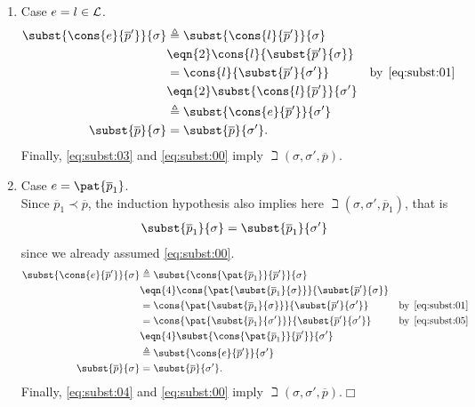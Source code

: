 \begin{enumerate}
\begin{enumerate}
      \item Case \(e = l \in {\cal L}\).
        \begin{align}
          \subst{\cons{e}{\overline{p}'}}{\sigma}
          &\triangleq \subst{\cons{l}{\overline{p}'}}{\sigma}\notag\\
          &\eqn{2} \cons{l}{\subst{\overline{p}'}{\sigma}}\notag\\
          &= \cons{l}{\subst{\overline{p}'}{\sigma'}}
          & \text{by} \,\; \eqref{eq:subst:01}\notag\\
          &\eqn{2} \subst{\cons{l}{\overline{p}'}}{\sigma'}\notag\\
          &\triangleq \subst{\cons{e}{\overline{p}'}}{\sigma'}\notag\\
          \subst{\overline{p}}{\sigma}
          &= \subst{\overline{p}}{\sigma'}. \label{eq:subst:03}
        \end{align}
        Finally, \eqref{eq:subst:03} and \eqref{eq:subst:00} imply
        \(\beth(\sigma, \sigma', \overline{p})\). 

  \item Case \(e = \pat{\overline{p}_1}\).\\ Since \(\overline{p}_1
    \prec \overline{p}\), the induction hypothesis also implies here
    \(\beth(\sigma, \sigma', \overline{p}_1)\), that is
    \begin{gather}
      \subst{\overline{p}_1}{\sigma} =
      \subst{\overline{p}_1}{\sigma'} \label{eq:subst:05}
    \end{gather}
    since we already assumed \eqref{eq:subst:00}.
    \begin{align}
      \subst{\cons{e}{\overline{p}'}}{\sigma}
       &\triangleq
      \subst{\cons{\pat{\overline{p}_1}}{\overline{p}'}}{\sigma}\notag\\
      &\eqn{4}
      \cons{\pat{\subst{\overline{p}_1}{\sigma}}}%
           {\subst{\overline{p}'}{\sigma}}\notag\\
      &= \cons{\pat{\subst{\overline{p}_1}{\sigma}}}%
              {\subst{\overline{p}'}{\sigma'}}
      & \text{by} \,\; \eqref{eq:subst:01}\notag\\
      &= \cons{\pat{\subst{\overline{p}_1}{\sigma'}}}%
              {\subst{\overline{p}'}{\sigma'}}
      & \text{by} \,\; \eqref{eq:subst:05}\notag\\
      &\eqn{4} \subst{\cons{\pat{\overline{p}_1}}{\overline{p}'}}%
                     {\sigma'}\notag\\
      &\triangleq \subst{\cons{e}{\overline{p}'}}{\sigma'}\notag\\
         \subst{\overline{p}}{\sigma}
      &= \subst{\overline{p}}{\sigma'}. \label{eq:subst:04}
    \end{align}
    Finally, \eqref{eq:subst:04} and \eqref{eq:subst:00} imply
    \(\beth(\sigma, \sigma', \overline{p})\).\hfill \(\Box\)

    \end{enumerate}

\end{enumerate}
